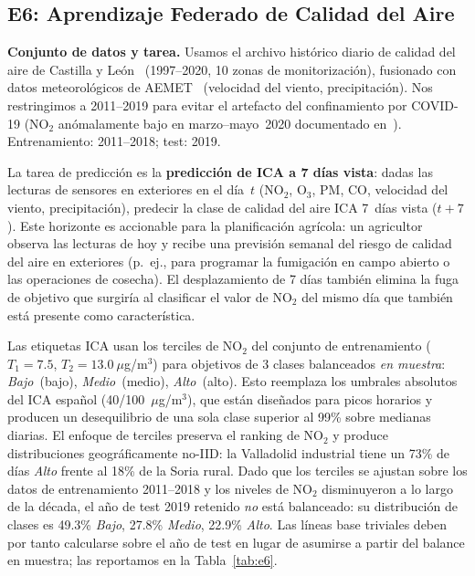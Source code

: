 \documentclass[journal]{IEEEtran}
\begin{document}
\subsection{E6: Aprendizaje Federado de Calidad del Aire}
\label{sec:e6}

\textbf{Conjunto de datos y tarea.} Usamos el archivo histórico diario de calidad del aire de Castilla y Le\'on~\cite{cyl2023airquality} (1997--2020, 10 zonas de monitorización), fusionado con datos meteorológicos de AEMET~\cite{aemet2023} (velocidad del viento, precipitación). Nos restringimos a 2011--2019 para evitar el artefacto del confinamiento por COVID-19 (NO$_2$ anómalamente bajo en marzo--mayo~2020 documentado en~\cite{lopezblanco2024airquality}). Entrenamiento: 2011--2018; test: 2019.

La tarea de predicción es la \textbf{predicción de ICA a 7 días vista}: dadas las lecturas de sensores en exteriores en el día~$t$ (NO$_2$, O$_3$, PM, CO, velocidad del viento, precipitación), predecir la clase de calidad del aire ICA 7~días vista ($t{+}7$). Este horizonte es accionable para la planificación agrícola: un agricultor observa las lecturas de hoy y recibe una previsión semanal del riesgo de calidad del aire en exteriores (p.~ej., para programar la fumigación en campo abierto o las operaciones de cosecha). El desplazamiento de 7 días también elimina la fuga de objetivo que surgiría al clasificar el valor de NO$_2$ del mismo día que también está presente como característica.

Las etiquetas ICA usan los terciles de NO$_2$ del conjunto de entrenamiento ($T_1{=}7.5$, $T_2{=}13.0~\mu$g/m$^3$) para objetivos de 3 clases balanceados \emph{en muestra}: \textit{Bajo}~(bajo), \textit{Medio}~(medio), \textit{Alto}~(alto). Esto reemplaza los umbrales absolutos del ICA español (40/100~$\mu$g/m$^3$), que están diseñados para picos horarios y producen un desequilibrio de una sola clase superior al 99\% sobre medianas diarias. El enfoque de terciles preserva el ranking de NO$_2$ y produce distribuciones geográficamente no-IID: la Valladolid industrial tiene un 73\% de días \textit{Alto} frente al 18\% de la Soria rural. Dado que los terciles se ajustan sobre los datos de entrenamiento 2011--2018 y los niveles de NO$_2$ disminuyeron a lo largo de la década, el año de test 2019 retenido \emph{no} está balanceado: su distribución de clases es 49.3\% \textit{Bajo}, 27.8\% \textit{Medio}, 22.9\% \textit{Alto}. Las líneas base triviales deben por tanto calcularse sobre el año de test en lugar de asumirse a partir del balance en muestra; las reportamos en la Tabla~\ref{tab:e6}.
\end{document}
